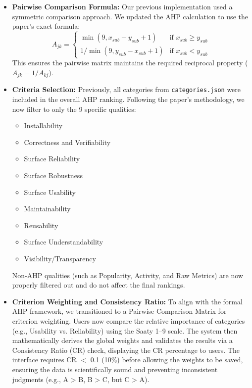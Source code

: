 \documentclass[12pt, titlepage]{article}
\begin{document}
\begin{itemize}
  \item \textbf{Pairwise Comparison Formula:} Our previous implementation used a symmetric comparison approach. We updated the AHP calculation to use the paper's exact formula:
  \[
  A_{jk} =
  \begin{cases}
  \min(9, x_{sub} - y_{sub} + 1) & \text{if } x_{sub} \geq y_{sub} \\
  1 / \min(9, y_{sub} - x_{sub} + 1) & \text{if } x_{sub} < y_{sub}
  \end{cases}
  \]
  This ensures the pairwise matrix maintains the required reciprocal property ($A_{jk} = 1 / A_{kj}$).

  \item \textbf{Criteria Selection:} Previously, all categories from \texttt{categories.json} were included in the overall AHP ranking. Following the paper's methodology, we now filter to only the 9 specific qualities:
  \begin{itemize}
    \item Installability
    \item Correctness and Verifiability
    \item Surface Reliability
    \item Surface Robustness
    \item Surface Usability
    \item Maintainability
    \item Reusability
    \item Surface Understandability
    \item Visibility/Transparency
  \end{itemize}
  Non-AHP qualities (such as Popularity, Activity, and Raw Metrics) are now properly filtered out and do not affect the final rankings.

  \item \textbf{Criterion Weighting and Consistency Ratio:} To align with the formal AHP framework, we transitioned to a Pairwise Comparison Matrix for criterion weighting. Users now compare the relative importance of categories (e.g., Usability vs. Reliability) using the Saaty 1--9 scale. The system then mathematically derives the global weights and validates the results via a Consistency Ratio (CR) check, displaying the CR percentage to users. The interface requires CR $<$ 0.1 (10\%) before allowing the weights to be saved, ensuring the data is scientifically sound and preventing inconsistent judgments (e.g., A > B, B > C, but C > A).
\end{itemize}
\end{document}
